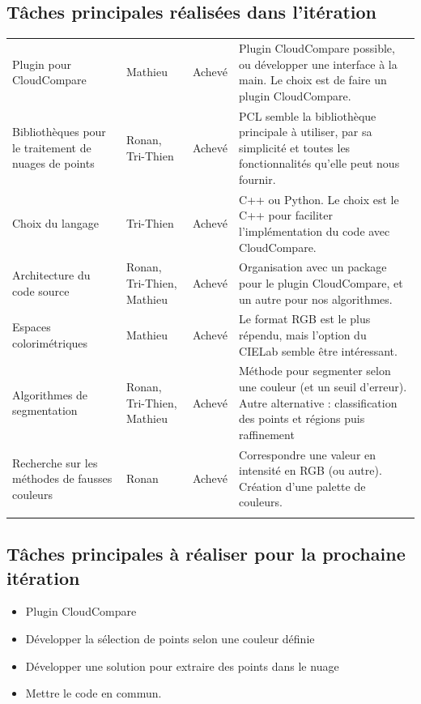 \documentclass[12pt,titlepage,french]{article}
\begin{document}
\subsection{Tâches principales réalisées dans l'itération}
\noindent\begin{tabu} to \toprule
  &&&\\\toprule
Plugin pour CloudCompare
& Mathieu
& Achevé
& Plugin CloudCompare possible, ou développer une interface à la main. Le choix est de faire un plugin CloudCompare.\\\midrule
Bibliothèques pour le traitement de nuages de points
& Ronan, Tri-Thien
& Achevé
& PCL semble la bibliothèque principale à utiliser, par sa simplicité et toutes les fonctionnalités qu'elle peut nous fournir.\\\midrule
Choix du langage
& Tri-Thien
& Achevé
& C++ ou Python. Le choix est le C++ pour faciliter l'implémentation du code avec CloudCompare. \\\midrule
Architecture du code source
& Ronan, Tri-Thien, Mathieu
& Achevé
& Organisation avec un package pour le plugin CloudCompare, et un autre pour nos algorithmes.\\\midrule
Espaces colorimétriques
& Mathieu
& Achevé
& Le format RGB est le plus répendu, mais l'option du CIELab semble être intéressant.\\\midrule
Algorithmes de segmentation
& Ronan, Tri-Thien, Mathieu
& Achevé
& Méthode pour segmenter selon une couleur (et un seuil d'erreur). Autre alternative : classification des points et régions puis raffinement\\\midrule
Recherche sur les méthodes de fausses couleurs
& Ronan
& Achevé
& Correspondre une valeur en intensité en RGB (ou autre). Création d'une palette de couleurs.\\\bottomrule  \\
\end{tabu}

\subsection{Tâches principales à réaliser pour la prochaine itération}
\begin{itemize}
  \item Plugin CloudCompare
  \item Développer la sélection de points selon une couleur définie
  \item Développer une solution pour extraire des points dans le nuage
  \item Mettre le code en commun.
\end{itemize}
\end{document}
